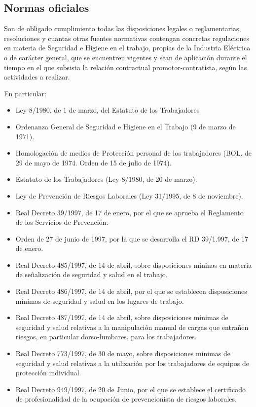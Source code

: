 \subsection{Normas oficiales}
\label{subsec:sys-normasOficiales}
Son de obligado cumplimiento todas las disposiciones legales o reglamentarias, resoluciones y cuantas otras fuentes normativas contengan concretas regulaciones en materia de Seguridad e Higiene en el trabajo, propias de la Industria Eléctrica o de carácter general, que se encuentren vigentes y sean de aplicación durante el tiempo en el que subsista la relación contractual promotor-contratista, según las actividades a realizar.

En particular:
\begin{itemize}
    \item Ley 8/1980, de 1 de marzo, del Estatuto de los Trabajadores
    \item Ordenanza General de Seguridad e Higiene en el Trabajo (9 de marzo de 1971).
    \item Homologación de medios de Protección personal de los trabajadores (BOL. de 29 de mayo de 1974. Orden de 15 de julio de 1974).
    \item Estatuto de los Trabajadores (Ley 8/1980, de 20 de marzo).
    \item Ley de Prevención de Riesgos Laborales (Ley 31/1995, de 8 de noviembre).
    \item Real Decreto 39/1997, de 17 de enero, por el que se aprueba el Reglamento de los Servicios de Prevención.
    \item Orden de 27 de junio de 1997, por la que se desarrolla el RD 39/1.997, de 17 de enero.
    \item Real Decreto 485/1997, de 14 de abril, sobre disposiciones mininas en materia de señalización de seguridad y salud en el trabajo.
    \item Real Decreto 486/1997, de 14 de abril, por el que se establecen disposiciones mínimas de seguridad y salud en los lugares de trabajo.
    \item Real Decreto 487/1997, de 14 de abril, sobre disposiciones mínimas de seguridad y salud relativas a la manipulación manual de cargas que entrañen riesgos, en particular dorso-lumbares, para los trabajadores.
    \item  Real Decreto 773/1997, de 30 de mayo, sobre disposiciones mínimas de seguridad y salud relativas a la utilización por los trabajadores de equipos de protección individual.
    \item Real Decreto 949/1997, de 20 de Junio, por el que se establece el certificado de profesionalidad de la ocupación de prevencionista de riesgos laborales. 

\end{itemize}
